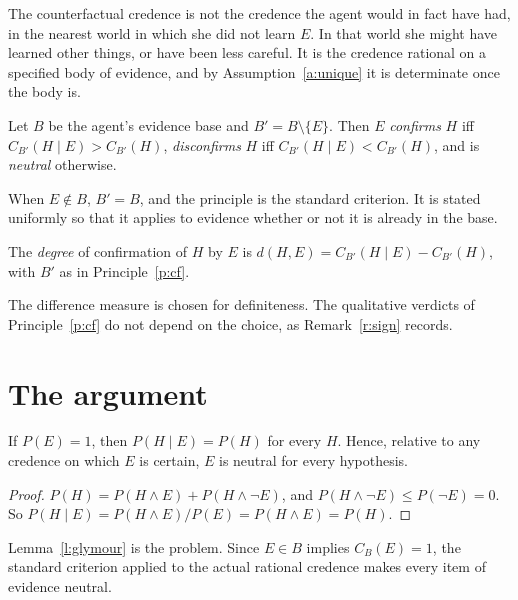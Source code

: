 \documentclass{situationist-preprint}
\begin{document}
The counterfactual credence is not the credence the agent would in fact have had, in the nearest world in which she did not learn $E$. In that world she might have learned other things, or have been less careful. It is the credence rational on a specified body of evidence, and by Assumption~\ref{a:unique} it is determinate once the body is.

\begin{principle}\label{p:cf}
Let $B$ be the agent's evidence base and $B' = B \setminus \{E\}$. Then $E$ \emph{confirms} $H$ iff $C_{B'}(H \mid E) > C_{B'}(H)$, \emph{disconfirms} $H$ iff $C_{B'}(H \mid E) < C_{B'}(H)$, and is \emph{neutral} otherwise.
\end{principle}

When $E \notin B$, $B' = B$, and the principle is the standard criterion. It is stated uniformly so that it applies to evidence whether or not it is already in the base.

\begin{definition}[Degree]\label{d:degree}
The \emph{degree} of confirmation of $H$ by $E$ is $d(H, E) = C_{B'}(H \mid E) - C_{B'}(H)$, with $B'$ as in Principle~\ref{p:cf}.
\end{definition}

The difference measure is chosen for definiteness. The qualitative verdicts of Principle~\ref{p:cf} do not depend on the choice, as Remark~\ref{r:sign} records.

\section{The argument}\label{s:argument}

\begin{lemma}[Glymour]\label{l:glymour}
If $P(E) = 1$, then $P(H \mid E) = P(H)$ for every $H$. Hence, relative to any credence on which $E$ is certain, $E$ is neutral for every hypothesis.
\end{lemma}

\begin{proof}
$P(H) = P(H \wedge E) + P(H \wedge \neg E)$, and $P(H \wedge \neg E) \leq P(\neg E) = 0$. So $P(H \mid E) = P(H \wedge E)/P(E) = P(H \wedge E) = P(H)$.
\end{proof}

Lemma~\ref{l:glymour} is the problem. Since $E \in B$ implies $C_B(E) = 1$, the standard criterion applied to the actual rational credence makes every item of evidence neutral.
\end{document}
